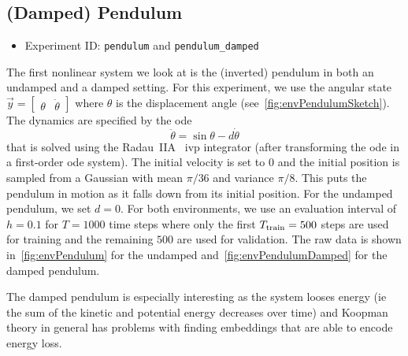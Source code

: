 	\subsection{(Damped) Pendulum}
		\begin{itemize}
			\item Experiment ID: \texttt{pendulum} and \texttt{pendulum\_damped}
		\end{itemize}

		The first nonlinear system we look at is the (inverted) pendulum in both an undamped and a damped setting. For this experiment, we use the angular state \( \vec{y} = \begin{bmatrix} \theta & \dot{\theta} \end{bmatrix} \) where \(\theta\) is the displacement angle (see~\autoref{fig:envPendulumSketch}). The dynamics are specified by the \ac{ode}
		\begin{equation*}
			\ddot{\theta} = \sin\theta - d \dot{\theta}
		\end{equation*}
		that is solved using the Radau~IIA~\cite{guglielmiImplementingRadauIIA2001} \ac{ivp} integrator (after transforming the \ac{ode} in a first-order \ac{ode} system). The initial velocity is set to \(0\) and the initial position is sampled from a Gaussian with mean \( \pi/36 \) and variance \( \pi/8 \). This puts the pendulum in motion as it falls down from its initial position. For the undamped pendulum, we set \( d = 0 \). For both environments, we use an evaluation interval of \( h = 0.1 \) for \( T = 1000 \) time steps where only the first \( T_{\mathrm{train}} = 500 \) steps are used for training and the remaining \(500\) are used for validation. The raw data is shown in~\autoref{fig:envPendulum} for the undamped and~\autoref{fig:envPendulumDamped} for the damped pendulum.

		The damped pendulum is especially interesting as the system looses energy (\ac{ie} the sum of the kinetic and potential energy decreases over time) and Koopman theory in general has problems with finding embeddings that are able to encode energy loss.

